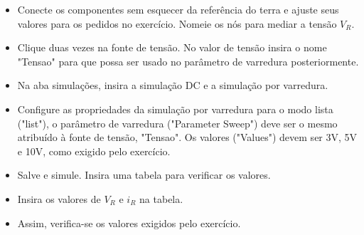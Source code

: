 \begin{itemize}
    \item Conecte os componentes sem esquecer da
    referência do terra e ajuste seus valores para os
    pedidos no exercício. Nomeie os nós para mediar a tensão $V_R$.
\end{itemize}

\begin{itemize}
    \item Clique duas vezes na fonte de tensão. No valor de tensão insira o nome "Tensao" para que possa ser usado no parâmetro de varredura posteriormente.
\end{itemize}

\begin{itemize}
    \item Na aba simulações, insira a simulação DC e a simulação por varredura. 
\end{itemize}

\begin{itemize}
    \item Configure as propriedades da simulação por varredura para o modo lista ("list"), o parâmetro de varredura ("Parameter Sweep") deve ser o mesmo atribuído à fonte de tensão, "Tensao". Os valores ("Values") devem ser 3V, 5V e 10V, como exigido pelo exercício.
\end{itemize}

\begin{itemize}
    \item Salve e simule. Insira uma tabela para verificar os valores.
\end{itemize}

\begin{itemize}
    \item Insira os valores de $V_R$ e $i_R$ na tabela.
\end{itemize}

\begin{itemize}
    \item Assim, verifica-se os valores exigidos pelo exercício.
\end{itemize}

